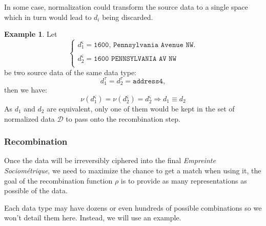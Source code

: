 \documentclass[twoside,twocolumn]{article}
\theoremstyle{definition}
\newtheorem{example}{Example}
\theoremstyle{remark}
\begin{document}
In some case, normalization could transform the source data to a single space which in turn would lead to $d_i$ being discarded.

\begin{example}
    Let $$\left\{
        \begin{array}{l}
            d_1^\varsigma = \texttt{1600, Pennsylvania Avenue NW.} \\ \\
            d_2^\varsigma = \texttt{1600 PENNSYLVANIA AV NW} \\
        \end{array}
    \right.$$
    be two source data of the same data type:$$
        d_1^\tau = d_2^\tau = \texttt{address4},
    $$
    then we have:$$
        \nu(d_1^\varsigma) = \nu(d_2^\varsigma) = d_2^\varsigma \Longrightarrow d_1 \equiv d_2
    $$
    As $d_1$ and $d_2$ are equivalent, only one of them would be kept in the set of normalized data $\mathcal{D}$ to pass onto the recombination step.
\end{example}

\subsubsection{Recombination}

Once the data will be irreversibly ciphered into the final \emph{Empreinte Sociométrique}, we need to maximize the chance to get a match when using it, the 
goal of the recombination function $\rho$ is to provide as many representations as possible of the data.

Each data type may have dozens or even hundreds of possible combinations so we won't detail them here.
Instead, we will use an example.
\end{document}
